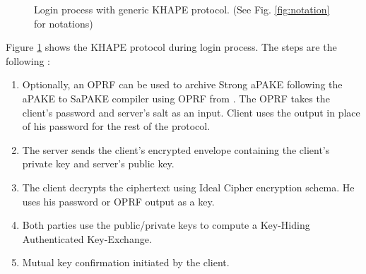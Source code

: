 \documentclass[../report.tex]{subfiles}
\begin{document}
\begin{figure}[h]
 \centering
 
 \setlength{\fboxsep}{10pt}
 \setlength{\fboxrule}{1pt}
 
 \caption{Login process with generic KHAPE protocol. (See Fig. \ref{fig:notation} for notations)}
 \label{fig:Generic_KHAPE}
\end{figure}

Figure \ref{fig:Generic_KHAPE} shows the KHAPE protocol during login process.
The steps are the following :

\begin{enumerate}
 \item Optionally, an OPRF can be used to archive Strong aPAKE following the aPAKE to SaPAKE compiler using OPRF from \cite{OPAQUE_Paper}. The OPRF takes the client's password and server's salt as an input. Client uses the output in place of his password for the rest of the protocol.
 \item The server sends the client's encrypted envelope containing the client's private key and server's public key.
 \item The client decrypts the ciphertext using Ideal Cipher encryption schema. He uses his password or OPRF output as a key.
 \item Both parties use the public/private keys to compute a Key-Hiding Authenticated Key-Exchange.
 \item Mutual key confirmation initiated by the client.
\end{enumerate}

\end{document}

